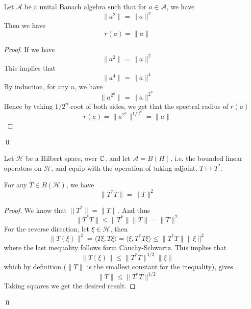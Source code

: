 \begin{proposition}
    Let $\mathcal{A}$ be a unital Banach algebra such that for $a\in\mathcal{A}$, we have
    \begin{equation*}
        \|a^2\|=\|a\|^2
    \end{equation*}
    Then we have
    \begin{equation*}
        r(a)=\|a\|
    \end{equation*}
\end{proposition}
\begin{proof}
    If we have
    \begin{equation*}
        \|a^2\|=\|a\|^2
    \end{equation*}
    This implies that
    \begin{equation*}
        \|a^4\|=\|a\|^4
    \end{equation*}
    By induction, for any $n$, we have
    \begin{equation*}
        \|a^{2^n}\|=\|a\|^{2^n}
    \end{equation*}
    Hence by taking $1/2^n$-root of both sides, we get that the spectral radius of $r(a)$
    \begin{equation*}
        r(a)=\|a^{2^n}\|^{1/2^n}=\|a\|
    \end{equation*}
\end{proof}
\qed

Let $\mathcal{H}$ be a Hilbert space, over $\mathbb{C}$, and let $\mathcal{A}=B(H)$, i.e. the bounded linear operators on $\mathcal{H}$, and equip with the operation of taking adjoint. $T\mapsto T^*$.

\begin{proposition}
    For any $T\in B(\mathcal{H})$, we have
    \begin{equation*}
        \|T^*T\|=\|T\|^2
    \end{equation*}
\end{proposition}
\begin{proof}
    We know that $\|T^*\|=\|T\|$. And thus
    \begin{equation*}
        \|T^*T\|\leq\|T^*\|\|T\|=\|T\|^2
    \end{equation*}
    For the reverse direction, let $\xi\in\mathcal{H}$, then
    \begin{equation*}
        \|T(\xi)\|^2=\langle T\xi, T\xi\rangle=\langle \xi, T^*T\xi\rangle\leq \|T^*T\|\|\xi\|^2
    \end{equation*} 
    where the last inequality follows form Cauchy-Schwartz. This implies that
    \begin{equation*}
        \|T(\xi)\|\leq \|T^*T\|^{1/2}\|\xi\|
    \end{equation*}
    which by definition ($\|T\|$ is the smallest constant for the inequality), gives
    \begin{equation*}
        \|T\|\leq\|T^*T\|^{1/2}
    \end{equation*}
    Taking squares we get the desired result.
\end{proof}
\qed

